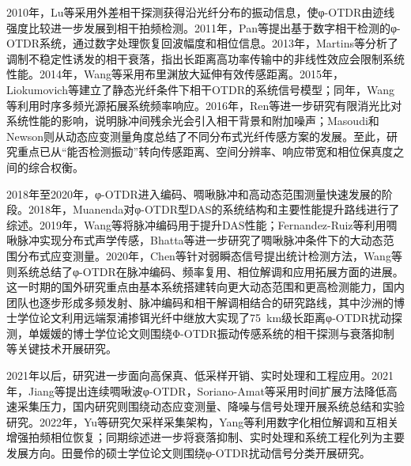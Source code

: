 2010年，Lu等采用外差相干探测获得沿光纤分布的振动信息，使φ-OTDR由迹线强度比较进一步发展到相干拍频检测\cite{lu2010distributed}。2011年，Pan等提出基于数字相干检测的φ-OTDR系统，通过数字处理恢复回波幅度和相位信息\cite{pan2011phase}。2013年，Martins等分析了调制不稳定性诱发的相干衰落，指出长距离高功率传输中的非线性效应会限制系统性能\cite{martins2013modulation}。2014年，Wang等采用布里渊放大延伸有效传感距离\cite{wang2014brillouin}。2015年，Liokumovich等建立了静态光纤条件下相干OTDR的系统信号模型\cite{liokumovich2015fundamentals}；同年，Wang等利用时序多频光源拓展系统频率响应\cite{wang2015ultrabroadband}。2016年，Ren等进一步研究有限消光比对系统性能的影响，说明脉冲间残余光会引入相干背景和附加噪声\cite{ren2016extinction}；Masoudi和Newson则从动态应变测量角度总结了不同分布式光纤传感方案的发展\cite{masoudi2016review}。至此，研究重点已从“能否检测振动”转向传感距离、空间分辨率、响应带宽和相位保真度之间的综合权衡。

2018年至2020年，φ-OTDR进入编码、啁啾脉冲和高动态范围测量快速发展的阶段。2018年，Muanenda对φ-OTDR型DAS的系统结构和主要性能提升路线进行了综述\cite{muanenda2018advances}。2019年，Wang等将脉冲编码用于提升DAS性能\cite{wang2019pulsecoding}；Fernandez-Ruiz等利用啁啾脉冲实现分布式声学传感\cite{fernandezruiz2019chirped}，Bhatta等进一步研究了啁啾脉冲条件下的大动态范围分布式应变测量\cite{bhatta2019dynamic}。2020年，Chen等针对弱瞬态信号提出统计检测方法\cite{chen2020transient}，Wang等则系统总结了φ-OTDR在脉冲编码、频率复用、相位解调和应用拓展方面的进展\cite{wang2020recent}。这一时期的国外研究重点由基本系统搭建转向更大动态范围和更高检测能力，国内团队也逐步形成多频发射、脉冲编码和相干解调相结合的研究路线，其中沙洲的博士学位论文利用远端泵浦掺铒光纤中继放大实现了75~km级长距离φ-OTDR扰动探测\cite{sha2018longhaul_thesis}，单媛媛的博士学位论文则围绕Φ-OTDR振动传感系统的相干探测与衰落抑制等关键技术开展研究\cite{shan2019key_thesis}。

2021年以后，研究进一步面向高保真、低采样开销、实时处理和工程应用。2021年，Jiang等提出连续啁啾波φ-OTDR\cite{jiang2021continuous}，Soriano-Amat等采用时间扩展方法降低高速采集压力\cite{sorianoamat2021time}，国内研究则围绕动态应变测量、降噪与信号处理开展系统总结和实验研究\cite{ma2021dynamic_cn,wu2021processing_cn,zhang2021phase_cn,rao2021recent,he2021review}。2022年，Yu等研究欠采样采集架构\cite{yu2022sampling}，Yang等利用数字化相位解调和互相关增强拍频相位恢复\cite{yang2022digitalized}；同期综述进一步将衰落抑制、实时处理和系统工程化列为主要发展方向\cite{liu2022advances,shang2022research,zhu2022linear}。田曼伶的硕士学位论文则围绕φ-OTDR扰动信号分类开展研究\cite{tian2022classification_thesis}。


